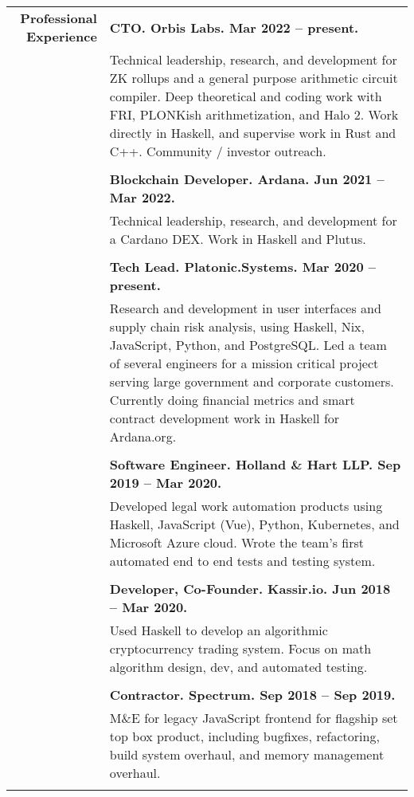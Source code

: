 \documentclass{article}
\begin{document}
\begin{tabular}{rl}
  {\bf Professional Experience} 
  & {\bf CTO. Orbis Labs. Mar 2022 -- present.} \\
  & \parbox{4.5in}{Technical leadership, research, and development for ZK rollups and a general purpose arithmetic circuit compiler. Deep theoretical and coding work with FRI, PLONKish arithmetization, and Halo 2. Work directly in Haskell, and supervise work in Rust and C++. Community / investor outreach.} \\ \\
  & {\bf Blockchain Developer. Ardana. Jun 2021 -- Mar 2022.} \\
  & \parbox{4.5in}{Technical leadership, research, and development for a Cardano DEX. Work in Haskell and Plutus.} \\ \\
  & {\bf Tech Lead. Platonic.Systems. Mar 2020 -- present.}\\
  & \parbox{4.5in}{Research and development in user interfaces and supply chain risk analysis, using Haskell, Nix, JavaScript, Python, and PostgreSQL. Led a team of several engineers for a mission critical project serving large government and corporate customers. Currently doing financial metrics and smart contract development work in Haskell for Ardana.org.} \\ \\
  & {\bf Software Engineer. Holland \& Hart LLP. Sep 2019 -- Mar 2020.} \\
  & \parbox{4.5in}{Developed legal work automation products using Haskell, JavaScript (Vue), Python, Kubernetes, and Microsoft Azure cloud. Wrote the team's first automated end to end tests and testing system.} \\ \\

  & {\bf Developer, Co-Founder. Kassir.io. Jun 2018 -- Mar 2020.} \\
  & \parbox{4.5in}{Used Haskell to develop an algorithmic cryptocurrency trading system. Focus on math algorithm design, dev, and automated testing.} \\ \\

  & {\bf Contractor. Spectrum. Sep 2018 -- Sep 2019.} \\
  & \parbox{4.5in}{M\&E for legacy JavaScript frontend for flagship set top box product, including bugfixes, refactoring, build system overhaul, and memory management overhaul.} \\ \\
\end{tabular}
\end{document}
